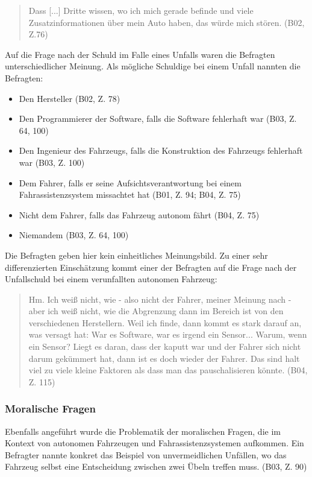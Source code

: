 \documentclass[12pt]{article}
\begin{document}
\begin{quote}
  Dass [...] Dritte wissen, wo ich mich gerade befinde und viele Zusatzinformationen über mein Auto haben, das würde mich stören. (B02, Z.76)
\end{quote}

Auf die Frage nach der Schuld im Falle eines Unfalls waren die Befragten unterschiedlicher Meinung. Als mögliche Schuldige bei einem Unfall nannten die Befragten:
\begin{itemize}
  \item Den Hersteller (B02, Z. 78)
  \item Den Programmierer der Software, falls die Software fehlerhaft war (B03, Z. 64, 100)
  \item Den Ingenieur des Fahrzeugs, falls die Konstruktion des Fahrzeugs fehlerhaft war (B03, Z. 100)
  \item Dem Fahrer, falls er seine Aufsichtsverantwortung bei einem Fahrassistenzsystem missachtet hat (B01, Z. 94; B04, Z. 75)
  \item Nicht dem Fahrer, falls das Fahrzeug autonom fährt (B04, Z. 75)
  \item Niemandem (B03, Z. 64, 100)
\end{itemize}

Die Befragten geben hier kein einheitliches Meinungsbild. Zu einer sehr differenzierten Einschätzung kommt einer der Befragten auf die Frage nach der Unfallschuld bei einem verunfallten autonomen Fahrzeug:

\begin{quote}
  Hm. Ich weiß nicht, wie - also nicht der Fahrer, meiner Meinung nach - aber ich weiß nicht, wie die Abgrenzung dann im Bereich ist von den verschiedenen Herstellern. Weil ich finde, dann kommt es stark darauf an, was versagt hat: War es Software, war es irgend ein Sensor... Warum, wenn ein Sensor? Liegt es daran, dass der kaputt war und der Fahrer sich nicht darum gekümmert hat, dann ist es doch wieder der Fahrer. Das sind halt viel zu viele kleine Faktoren als dass man das pauschalisieren könnte. (B04, Z. 115)
\end{quote}

\subsubsection*{Moralische Fragen}
Ebenfalls angeführt wurde die Problematik der moralischen Fragen, die im Kontext von autonomen Fahrzeugen und Fahrassistenzsystemen aufkommen. Ein Befragter nannte konkret das Beispiel von unvermeidlichen Unfällen, wo das Fahrzeug selbst eine Entscheidung zwischen zwei Übeln treffen muss. (B03, Z. 90)
\end{document}
